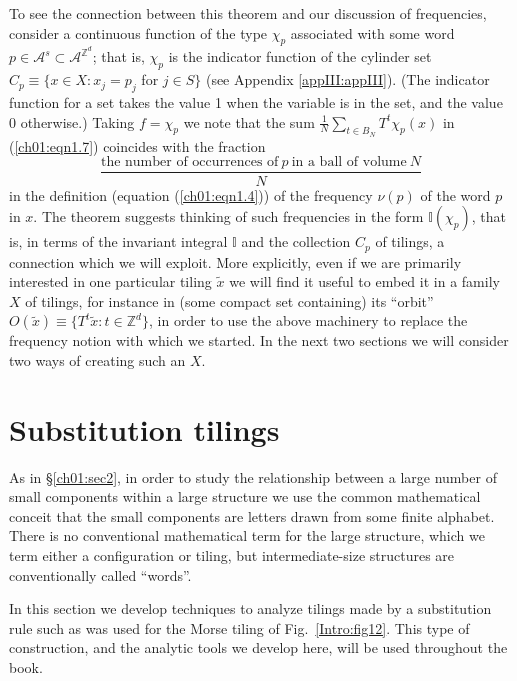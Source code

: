 \documentclass[reqno]{stml-l}
\theoremstyle{plain}
\theoremstyle{definition}
\numberwithin{equation}{chapter}
\begin{document}
To see the connection between this theorem and our
discussion of frequencies, consider a continuous function
of the type $\chi_{p}$
associated with some word $p\in \mathcal{A}^{s}\subset
\mathcal{A}^{\mathbb{Z}^{d}}$; that is, $\chi_{p}$ is the
indicator function of the cylinder set $C_{p}\equiv\{x\in
X:x_{j}=p_{j}$ for $j\in S\}$ (see Appendix \ref{appIII:appIII}). (The
indicator function for a set takes the value 1 when the
variable is in the set, and the value 0 otherwise.) Taking
$f=\chi_{p}$ we note that the sum
$\frac{1}{N}\sum\nolimits_{t\in B_{N}}T^{t}\chi_{p}(x)$ in
(\ref{ch01:eqn1.7}) coincides with the fraction
\begin{equation}
\frac{\text{the number of occurrences of}\ p\ \text{in a ball of volume}\
N}{N} \label{ch01:eqn1.9}
\end{equation}
in the definition  (equation (\ref{ch01:eqn1.4})) of the
frequency $\nu(p)$ of the word $p$ in
$x$. The theorem suggests thinking of such frequencies in
the form $\mathbb{I}(\chi_{p})$, that is, in terms of the
invariant integral $\mathbb{I}$ and the collection $C_{p}$
of tilings, a connection which we will exploit. More
explicitly, even if we are primarily interested in one
particular tiling $\tilde{x}$ we will find it useful to
embed it in a family $X$ of tilings, for instance in (some
compact set containing) its ``orbit''
$O(\tilde{x})\equiv\{T^{t}\tilde{x}:t\in
\mathbb{Z}^{d}\}$, in order to use
the above machinery to replace the frequency notion with
which we started. In the next two sections we will consider
two ways of creating such an $X$.

\section{Substitution tilings}\label{ch01:sec3}

As in \S\ref{ch01:sec2}, in order to study the relationship
between a large number of small components within a large
structure we use the common mathematical conceit that the
small components are letters drawn from some finite
alphabet. There is no conventional mathematical term for
the large structure, which we term either a configuration
or tiling, but intermediate-size structures are
conventionally called ``words''.

In this section we develop techniques to analyze tilings
made by a substitution rule such as was used for the Morse
tiling of Fig.~\ref{Intro:fig12}. This type of
construction, and the analytic tools we develop here, will
be used throughout the book.
\end{document}
